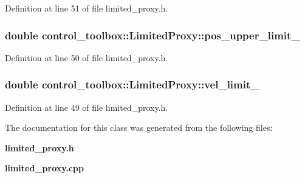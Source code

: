 \-Definition at line 51 of file limited\-\_\-proxy.\-h.

\subsubsection[{pos\-\_\-upper\-\_\-limit\-\_\-}]{\setlength{\rightskip}{0pt plus 5cm}double {\bf control\-\_\-toolbox\-::\-Limited\-Proxy\-::pos\-\_\-upper\-\_\-limit\-\_\-}}\label{classcontrol__toolbox_1_1LimitedProxy_a5611fbbca81ce96bc6cee791182e2c43}


\-Definition at line 50 of file limited\-\_\-proxy.\-h.

\subsubsection[{vel\-\_\-limit\-\_\-}]{\setlength{\rightskip}{0pt plus 5cm}double {\bf control\-\_\-toolbox\-::\-Limited\-Proxy\-::vel\-\_\-limit\-\_\-}}\label{classcontrol__toolbox_1_1LimitedProxy_abb1ce3f702026a9c40717de3022d788e}


\-Definition at line 49 of file limited\-\_\-proxy.\-h.



\-The documentation for this class was generated from the following files\-:\begin{DoxyCompactItemize}
\item 
{\bf limited\-\_\-proxy.\-h}\item 
{\bf limited\-\_\-proxy.\-cpp}\end{DoxyCompactItemize}
